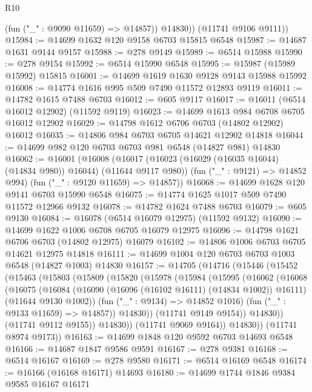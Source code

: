 \begin{lexlean}{R10}
\begin{coremodule}
            (fun ("_" : @9090 @11659) => @14857))
          @14830))
      (@11741 @9106 @9111))
@15984 := @14699 @1632 @120 @9158 @6703 @15815 @6548
@15987 := @14687 @1631 @9144 @9157
@15988 := @278 @9149
@15989 := @6514 @15988
@15990 := @278 @9154
@15992 := @6514 @15990 @6548
@15995 := @15987 (@15989 @15992) @15815
@16001 := @14699 @1619 @1630 @9128 @9143 @15988 @15992
@16008 := @14774 @1616 @995 @509 @7490 @11572 @12893 @9119
@16011 := @14782 @1615 @7488 @6703
@16012 := @605 @9117
@16017 := @16011 (@6514 @16012 @12902) (@11592 @9119)
@16023 := @14699 @1613 @984 @6708 @6705 @16012 @12902
@16029 := @14798 @1612 @6706 @6703 (@14802 @12902) @16012
@16035 := @14806 @984 @6703 @6705 @14621 @12902 @14818
@16044 := @14699 @982 @120 @6703 @6703 @981 @6548 (@14827 @981) @14830
@16062 := @16001
    (@16008
      (@16017 (@16023 (@16029 (@16035 @16044) (@14834 @980)) @16044) (@11644 @9117 @980))
      (fun ("_" : @9121) => @14852 @994)
      (fun ("_" : @9120 @11659) => @14857))
@16068 := @14699 @1628 @120 @9141 @6703 @15990 @6548
@16075 := @14774 @1625 @1017 @509 @7490 @11572 @12966 @9132
@16078 := @14782 @1624 @7488 @6703
@16079 := @605 @9130
@16084 := @16078 (@6514 @16079 @12975) (@11592 @9132)
@16090 := @14699 @1622 @1006 @6708 @6705 @16079 @12975
@16096 := @14798 @1621 @6706 @6703 (@14802 @12975) @16079
@16102 := @14806 @1006 @6703 @6705 @14621 @12975 @14818
@16111 := @14699 @1004 @120 @6703 @6703 @1003 @6548 (@14827 @1003) @14830
@16157 := @14705
    (@14716
      (@15446
        (@15452
          (@15463
            (@15803
              (@15809
                (@15820
                  (@15978
                    (@15984
                      (@15995
                        (@16062
                          (@16068
                            (@16075
                              (@16084
                                (@16090 (@16096 (@16102 @16111) (@14834 @1002)) @16111)
                                (@11644 @9130 @1002))
                              (fun ("_" : @9134) => @14852 @1016)
                              (fun ("_" : @9133 @11659) => @14857))
                            @14830))
                        (@11741 @9149 @9154))
                      @14830))
                  (@11741 @9112 @9155))
                @14830))
            (@11741 @9069 @9164))
          @14830))
      (@11741 @8974 @9173))
@16163 := @14699 @1848 @120 @9592 @6703 @14693 @6548
@16166 := @14687 @1847 @9586 @9591
@16167 := @278 @9381
@16168 := @6514 @16167
@16169 := @278 @9580
@16171 := @6514 @16169 @6548
@16174 := @16166 (@16168 @16171) @14693
@16180 := @14699 @1744 @1846 @9384 @9585 @16167 @16171

\end{coremodule}
\end{lexlean}
